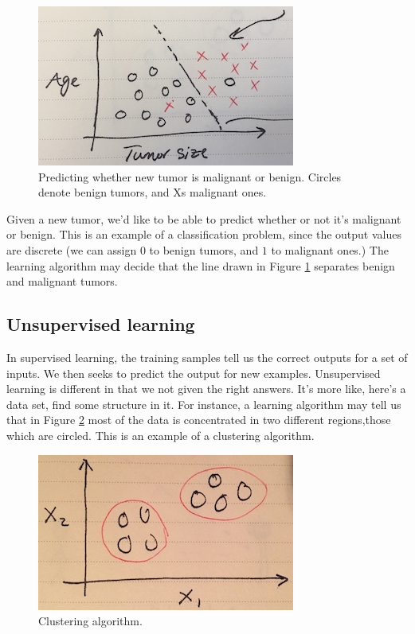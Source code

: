 \documentclass{article}
\theoremstyle{definition}
\begin{document}
\begin{figure}[ht]
\centering
\includegraphics[scale=0.8]{images/intro/tumor.jpg}
\caption{Predicting whether new tumor is malignant or benign. Circles denote benign tumors, and Xs malignant ones.}
\label{intro-tumor}
\end{figure}

Given a new tumor, we'd like to be able to predict whether or not it's malignant or benign. This is an example of a classification problem, since the output values are discrete (we can assign $0$ to benign tumors, and $1$ to malignant ones.) The learning algorithm may decide that the line drawn in Figure \ref{intro-tumor} separates benign and malignant tumors.

\subsection{Unsupervised learning}
In supervised learning, the training samples tell us the correct outputs for a set of inputs. We then seeks to predict the output for new examples. Unsupervised learning is different in that we not given the right answers. It's more like, here's a data set, find some structure in it. For instance, a learning algorithm may tell us that in Figure \ref{intro-clustering} most of the data is concentrated in two different regions,those which are circled. This is an example of a clustering algorithm.

\begin{figure}[ht]
\centering
\includegraphics[scale=0.8]{images/intro/clustering.jpg}
\caption{Clustering algorithm.}
\label{intro-clustering}
\end{figure}
\end{document}
